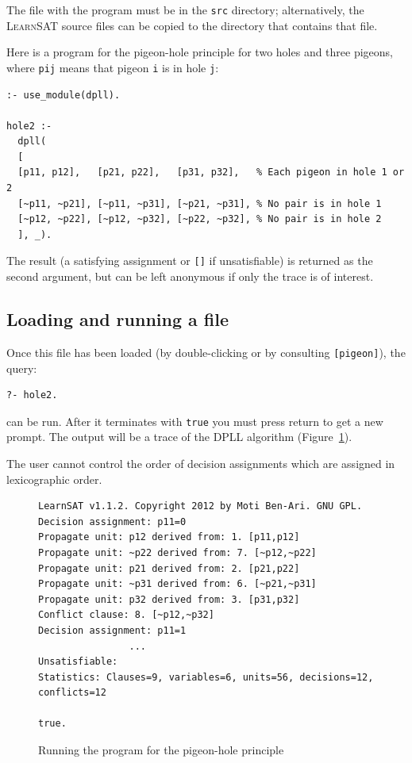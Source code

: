 \documentclass[11pt]{report}
\newcommand*{\p}[1]{\textup{\texttt{#1}}}
\newcommand*{\ls}{\textsc{LearnSAT}}
\begin{document}
The file with the program must be in the \p{src} directory;
alternatively, the \ls{} source files can be copied to the directory
that contains that file.

Here is a program for the pigeon-hole principle for two holes and three
pigeons, where \p{pij} means that pigeon \p{i} is in hole \p{j}:

\begin{verbatim}
:- use_module(dpll).

hole2 :-
  dpll(
  [
  [p11, p12],   [p21, p22],   [p31, p32],   % Each pigeon in hole 1 or 2 
  [~p11, ~p21], [~p11, ~p31], [~p21, ~p31], % No pair is in hole 1
  [~p12, ~p22], [~p12, ~p32], [~p22, ~p32], % No pair is in hole 2
  ], _).
\end{verbatim}

The result (a satisfying assignment or \p{[]} if unsatisfiable) is
returned as the second argument, but can be left anonymous if only
the trace is of interest.

\subsection{Loading and running a file}

Once this file has been loaded (by double-clicking or by consulting
\p{[pigeon]}), the query:
\begin{verbatim}
?- hole2. 
\end{verbatim}

can be run. After it terminates with \p{true} you must press
return to get a new prompt. The output will be a trace of the DPLL
algorithm (Figure~\ref{fig.pigeon}).

The user cannot control the order of decision assignments which are
assigned in lexicographic order.

\begin{figure}[tbp]
\begin{verbatim}
LearnSAT v1.1.2. Copyright 2012 by Moti Ben-Ari. GNU GPL.
Decision assignment: p11=0
Propagate unit: p12 derived from: 1. [p11,p12]
Propagate unit: ~p22 derived from: 7. [~p12,~p22]
Propagate unit: p21 derived from: 2. [p21,p22]
Propagate unit: ~p31 derived from: 6. [~p21,~p31]
Propagate unit: p32 derived from: 3. [p31,p32]
Conflict clause: 8. [~p12,~p32]
Decision assignment: p11=1
                ...
Unsatisfiable:
Statistics: Clauses=9, variables=6, units=56, decisions=12, conflicts=12

true.
\end{verbatim}
\caption{Running the program for the pigeon-hole principle}\label{fig.pigeon}
\end{figure}
\end{document}
